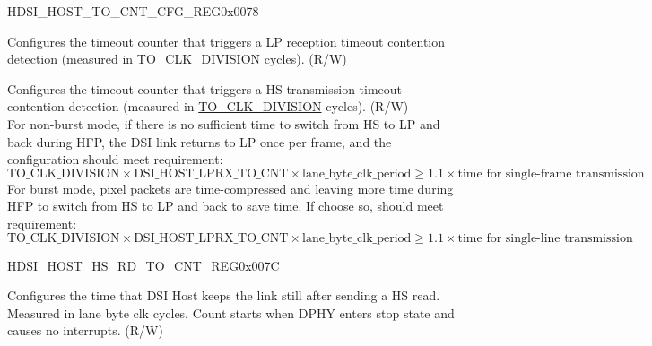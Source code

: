 \begin{register}{H}{DSI\_HOST\_TO\_CNT\_CFG\_REG}{0x0078}\label{regdesc:DSIHOSTTOCNTCFGREG}
%
%
\regnewline%
\begin{regdesc}\begin{reglist}
\label{fielddesc:DSIHOSTLPRXTOCNT}\item [DSI\_HOST\_LPRX\_TO\_CNT] Configures the timeout counter that triggers a LP reception timeout contention detection (measured in \hyperref[fielddesc:DSIHOSTTOCLKDIVISION]{TO\_CLK\_DIVISION} cycles). (R/W)
\label{fielddesc:DSIHOSTHSTXTOCNT}\item [DSI\_HOST\_HSTX\_TO\_CNT] Configures the timeout counter that triggers a HS transmission timeout contention detection (measured in \hyperref[fielddesc:DSIHOSTTOCLKDIVISION]{TO\_CLK\_DIVISION} cycles). (R/W)\\
For non-burst mode, if there is no sufficient time to switch from HS to LP and back during HFP, the DSI link returns to LP once per frame, and the configuration should meet requirement:
\[
\hyperref[fielddesc:DSIHOSTTOCLKDIVISION]{\text{TO\_CLK\_DIVISION}} × \hyperref[fielddesc:DSIHOSTLPRXTOCNT]{\text{DSI\_HOST\_LPRX\_TO\_CNT}} × \text{lane\_byte\_clk\_period} \ge 1.1 × \text{time for single-frame transmission}
\]
For burst mode, pixel packets are time-compressed and leaving more time during HFP to switch from HS to LP and back to save time. If choose so, should meet requirement:
\[
\hyperref[fielddesc:DSIHOSTTOCLKDIVISION]{\text{TO\_CLK\_DIVISION}} × \hyperref[fielddesc:DSIHOSTLPRXTOCNT]{\text{DSI\_HOST\_LPRX\_TO\_CNT}} × \text{lane\_byte\_clk\_period} \ge 1.1 × \text{time for single-line transmission}
\]
\end{reglist}\end{regdesc}
\end{register}


\begin{register}{H}{DSI\_HOST\_HS\_RD\_TO\_CNT\_REG}{0x007C}\label{regdesc:DSIHOSTHSRDTOCNTREG}
%
%
\regnewline%
\begin{regdesc}\begin{reglist}
\label{fielddesc:DSIHOSTHSRDTOCNT}\item [DSI\_HOST\_HS\_RD\_TO\_CNT] Configures the time that DSI Host keeps the link still after sending a HS read. Measured in lane byte clk cycles. Count starts when DPHY enters stop state and causes no interrupts. (R/W)
\end{reglist}\end{regdesc}
\end{register}


